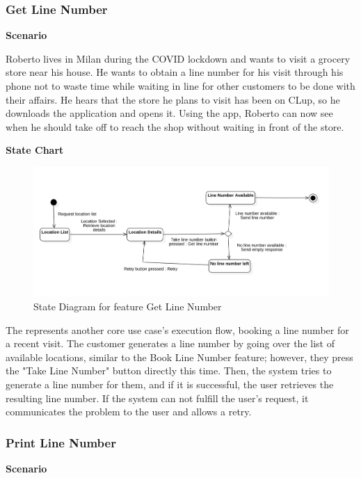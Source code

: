 \subsubsection{Get Line Number}

\textbf{Scenario}

Roberto lives in Milan during the COVID lockdown and wants to visit a grocery store near his house.
He wants to obtain a line number for his visit through his phone not to waste time while waiting in line for other customers to be done with their affairs.
He hears that the store he plans to visit has been on CLup, so he downloads the application and opens it.
Using the app, Roberto can now see when he should take off to reach the shop without waiting in front of the store.

\textbf{State Chart}

\begin{figure}[H]
    \centering
    \includegraphics[height=0.4\textwidth]{Images/StateCharts/GenerateLineNumber.png}
    \caption{State Diagram for feature Get Line Number}
    \label{fig:SDGetLine}
\end{figure}

The  represents another core use case's execution flow, booking a line number for a recent visit.
The customer generates a line number by going over the list of available locations, similar to the Book Line Number feature; however, they press the "Take Line Number" button directly this time.
Then, the system tries to generate a line number for them, and if it is successful, the user retrieves the resulting line number.
If the system can not fulfill the user's request, it communicates the problem to the user and allows a retry.

\subsubsection{Print Line Number}

\textbf{Scenario}

